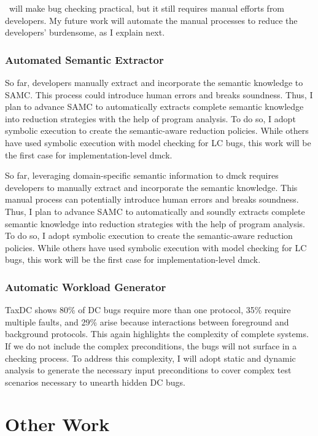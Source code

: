 \documentclass[11pt]{article}
\begin{document}
\fullcheck\ will make bug checking practical, but it still requires manual
efforts from developers. My future work will automate the manual processes
to reduce the developers' burdensome, as I explain next.

\subsubsection*{Automated Semantic Extractor}

So far, developers manually extract and incorporate the semantic knowledge to
SAMC. This process could introduce human errors and breaks soundness. Thus, I
plan to advance SAMC to automatically extracts complete semantic
knowledge into reduction strategies with the help of program analysis. To do
so, I adopt symbolic execution to create the semantic-aware reduction policies.
While others have used symbolic execution with model checking for LC bugs, this
work will be the first case for implementation-level dmck. 

So far, leveraging domain-specific semantic information to dmck requires
developers to manually extract and incorporate the semantic knowledge. This
manual process can potentially introduce human errors and breaks soundness.
Thus, I plan to advance SAMC to automatically and soundly extracts complete
semantic knowledge into reduction strategies with the help of program analysis.
To do so, I adopt symbolic execution to create the semantic-aware reduction
policies. While others have used symbolic execution with model checking for LC
bugs, this work will be the first case for implementation-level dmck. 
\fi

\subsubsection*{Automatic Workload Generator}

TaxDC shows 80\% of DC bugs require more than one protocol, 35\% require
multiple faults, and 29\% arise because interactions between foreground and
background protocols. This again highlights the complexity of complete
systems. If we do not include the complex preconditions, the bugs will not
surface in a checking process. To address this complexity, I will adopt static
and dynamic analysis to generate the necessary input preconditions to cover
complex test scenarios necessary to unearth hidden DC bugs.

\section{Other Work}
\end{document}
